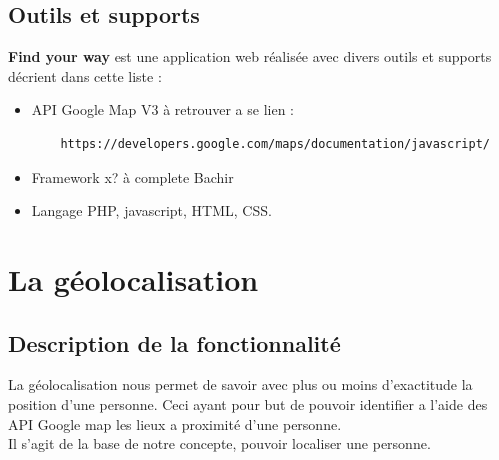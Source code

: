 \documentclass[10pt,a4paper]{report}
\begin{document}
\subsection{Outils et supports}

\begin{flushleft}
\textbf{Find your way} est une application web réalisée avec divers outils et supports décrient dans cette liste :

\begin{itemize}

\item API Google Map V3 à retrouver a se lien :
\begin{verbatim}
	https://developers.google.com/maps/documentation/javascript/
\end{verbatim} 

\item Framework x?  à complete Bachir

\item Langage PHP, javascript, HTML, CSS. 

\end{itemize}
\end{flushleft}


\section{La géolocalisation}

\subsection{Description de la fonctionnalité}
\begin{flushleft}
La géolocalisation nous permet de savoir avec plus ou moins d'exactitude la position d'une personne. Ceci ayant pour but de pouvoir identifier a l'aide des API Google map les lieux a proximité d'une personne. \\

Il s'agit de la base de notre concepte, pouvoir localiser une personne.
\end{flushleft}
\end{document}
